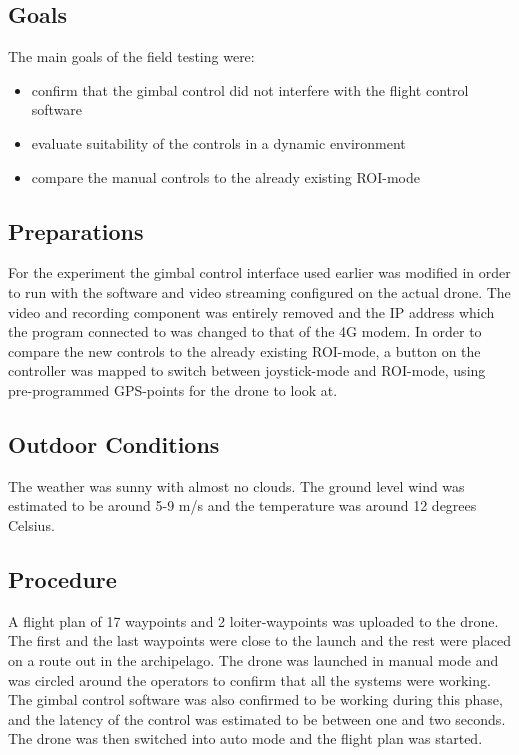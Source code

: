 \documentclass[nofilelist]{cslthse-msc}
\begin{document}
\subsection{Goals}
The main goals of the field testing were:
\begin{itemize}
   \item confirm that the gimbal control did not interfere with the flight control software
   \item evaluate suitability of the controls in a dynamic environment
   \item compare the manual controls to the already existing ROI-mode
\end{itemize} 

\subsection{Preparations}
For the experiment the gimbal control interface used earlier was modified in order to run with the software and video streaming configured on the actual drone. The video and recording component was entirely removed and the IP address which the program connected to was changed to that of the 4G modem. 
In order to compare the new controls to the already existing ROI-mode, a button on the controller was mapped to switch between joystick-mode and ROI-mode, using pre-programmed GPS-points for the drone to look at.

\subsection{Outdoor Conditions}
The weather was sunny with almost no clouds. The ground level wind was estimated to be around 5-9 m/s and the temperature was around 12 degrees Celsius.

\subsection{Procedure}
A flight plan of 17 waypoints and 2 loiter-waypoints was uploaded to the drone. The first and the last waypoints were close to the launch and the rest were placed on a route out in the archipelago. The drone was launched in manual mode and was circled around the operators to confirm that all the systems were working. The gimbal control software was also confirmed to be working during this phase, and the latency of the control was estimated to be between one and two seconds. 
The drone was then switched into auto mode and the flight plan was started.
\end{document}
